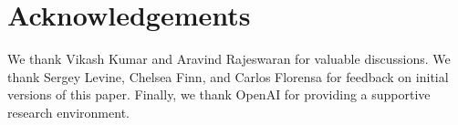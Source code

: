 \documentclass[letterpaper, 10 pt, conference]{ieeeconf}  %
\begin{document}
\section{Acknowledgements}

\noindent We thank Vikash Kumar and Aravind Rajeswaran for valuable discussions. We thank Sergey Levine, Chelsea Finn, and Carlos Florensa for feedback on initial versions of this paper. Finally, we thank OpenAI for providing a supportive research environment.

{\small


}
\end{document}
